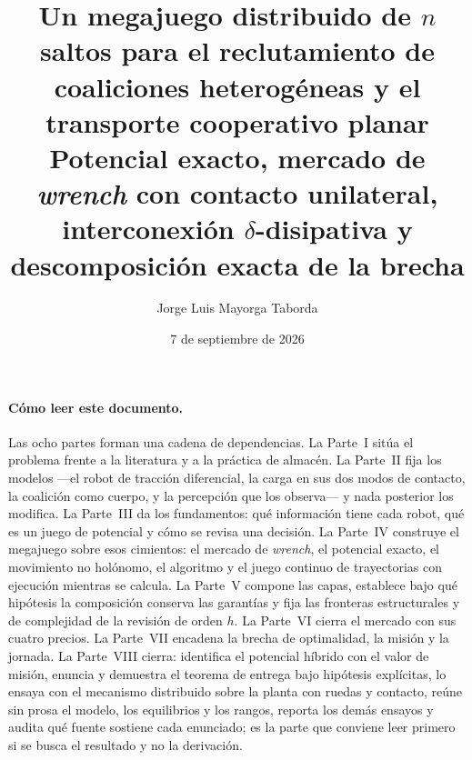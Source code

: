 \documentclass[11pt,a4paper]{article}
\title{\bfseries Un megajuego distribuido de $n$ saltos para el reclutamiento
de coaliciones heterogéneas y el transporte cooperativo planar\\[0.35em]
\large Potencial exacto, mercado de \emph{wrench} con contacto unilateral,
interconexión $\delta$-disipativa y descomposición exacta de la brecha}
\author{Jorge Luis Mayorga Taborda}
\date{7 de septiembre de 2026}
\theoremstyle{plain}
\theoremstyle{definition}
\theoremstyle{remark}
\begin{document}
\maketitle

\setcounter{tocdepth}{1}
\tableofcontents
\bigskip
\paragraph{Cómo leer este documento.} Las ocho partes forman una cadena de dependencias. La Parte~I sitúa el problema frente a la literatura y a la práctica de almacén. La Parte~II fija los modelos —el robot de tracción diferencial, la carga en sus dos modos de contacto, la coalición como cuerpo, y la percepción que los observa— y nada posterior los modifica. La Parte~III da los fundamentos: qué información tiene cada robot, qué es un juego de potencial y cómo se revisa una decisión. La Parte~IV construye el megajuego sobre esos cimientos: el mercado de \emph{wrench}, el potencial exacto, el movimiento no holónomo, el algoritmo y el juego continuo de trayectorias con ejecución mientras se calcula. La Parte~V compone las capas, establece bajo qué hipótesis la composición conserva las garantías y fija las fronteras estructurales y de complejidad de la revisión de orden $h$. La Parte~VI cierra el mercado con sus cuatro precios. La Parte~VII encadena la brecha de optimalidad, la misión y la jornada. La Parte~VIII cierra: identifica el potencial híbrido con el valor de misión, enuncia y demuestra el teorema de entrega bajo hipótesis explícitas, lo ensaya con el mecanismo distribuido sobre la planta con ruedas y contacto, reúne sin prosa el modelo, los equilibrios y los rangos, reporta los demás ensayos y audita qué fuente sostiene cada enunciado; es la parte que conviene leer primero si se busca el resultado y no la derivación.
\end{document}

